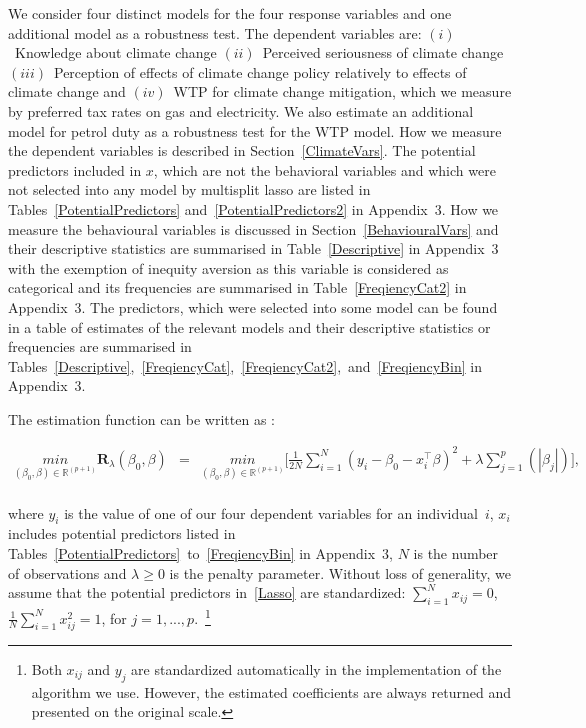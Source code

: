 \documentclass[a4paper,12pt]{article}
\begin{document}
We consider four distinct models for the four response variables and one additional model as a robustness test. The dependent variables are: $(i)$~Knowledge about climate change $(ii)$~Perceived seriousness of climate change $(iii)$~Perception of effects of climate change policy relatively to effects of climate change and $(iv)$~WTP for climate change mitigation, which we measure by preferred tax rates on gas and electricity. We also estimate an additional model for petrol duty as a robustness test for the WTP model. How we measure the dependent variables is described in Section~\ref{ClimateVars}. The potential predictors included in $x$, which are not the behavioral variables and which were not selected into any model by multisplit lasso are listed in Tables~\ref{PotentialPredictors} and~\ref{PotentialPredictors2} in Appendix~$3$. How we measure the behavioural variables is discussed in Section~\ref{BehaviouralVars} and their descriptive statistics are summarised in Table~\ref{Descriptive} in Appendix~$3$ with the exemption of inequity aversion as this variable is considered as categorical and its frequencies are summarised in Table~\ref{FreqiencyCat2} in Appendix~$3$. The predictors, which were selected into some model can be found in a table of estimates of the relevant models and their descriptive statistics or frequencies are summarised in Tables~\ref{Descriptive},~\ref{FreqiencyCat},~\ref{FreqiencyCat2},~and~\ref{FreqiencyBin} in Appendix~$3$.

\sloppy
The estimation function can be written as \citep{Friedman2010}:


\begin{equation}\label{Lasso}
\begin{array}{lcll}

 \underset{(\beta_0, \beta) \in \mathbb{R}^{(p+1)}}{min} \boldsymbol{R}_{\lambda}(\beta_0, \beta)&=&
   \underset{(\beta_0, \beta) \in \mathbb{R}^{(p+1)}}{min} \bigg[ \frac{1}{2N}\sum_{i=1}^{N}(y_i - \beta_0-x_i^{\intercal}\beta)^2 + \lambda\sum_{j=1}^{p}(|\beta_j|) \bigg], \\
\end{array}
\end{equation}


where $y_i$ is the value of one of our four dependent variables for an individual~$i$, $x_i$ includes potential predictors listed in Tables~\ref{PotentialPredictors}~to~\ref{FreqiencyBin} in Appendix~$3$, $N$ is the number of observations and $\lambda \geq 0$ is the penalty parameter. Without loss of generality, we assume that the potential predictors in~\eqref{Lasso} are standardized: ${\sum_{i=1}^{N}x_{ij} =0}$, ${\frac{1}{N}\sum_{i=1}^{N}x_{ij}^2=1}$, for $j=1,...,p$.~\footnote{Both $x_{ij}$ and $y_j$ are standardized automatically in the implementation of the algorithm  we use. However, the estimated coefficients are always returned and presented on the original scale.} 
\end{document}

